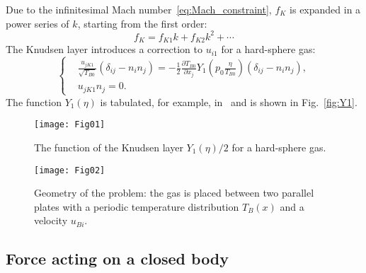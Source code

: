 \documentclass[smallextended, final]{svjour3} %
\newcommand{\pder}[2][]{\frac{\partial#1}{\partial#2}}
\begin{document}
Due to the infinitesimal Mach number~\eqref{eq:Mach_constraint}, \(f_K\) is expanded
in a power series of \(k\), starting from the first order:
\[ f_K = f_{K1} k + f_{K2} k ^ 2 + \cdots \]
The Knudsen layer introduces a correction to \(u_{i1}\) for a hard-sphere gas:
\begin{equation}
    \left\{
    \begin{aligned}
        & \frac{u_{jK1}}{\sqrt{T_{B0}}}(\delta_{ij}-n_in_j) =
            -\frac12\pder[T_{B0}]{x_j} Y_1\left(p_0\frac\eta{T_{B0}}\right) (\delta_{ij}-n_in_j), \\
        & u_{jK1}n_j = 0.
    \end{aligned}
    \right. \label{eq:bound:v_K}
\end{equation}
The function \(Y_1(\eta)\) is tabulated, for example, in~\cite{Sone2002, Sone2007} and is shown in Fig.~\ref{fig:Y1}.

\begin{figure}[ht]
    \centering
    \begin{minipage}{.48\textwidth}
        \centering
        \texttt{[image: Fig01]}
        \caption{The function of the Knudsen layer \(Y_1(\eta)/2\) for a hard-sphere gas.}
        \label{fig:Y1}
    \end{minipage}
    \quad
    \begin{minipage}{.48\textwidth}
        \centering
        \texttt{[image: Fig02]}
        \vspace{13pt}
        \caption{Geometry of the problem: the gas is placed between two parallel plates
            with a periodic temperature distribution \(T_B(x)\) and a velocity \(u_{Bi}\).}
        \label{fig:geometry}
    \end{minipage}
\end{figure}

\subsection{Force acting on a closed body}
\end{document}
